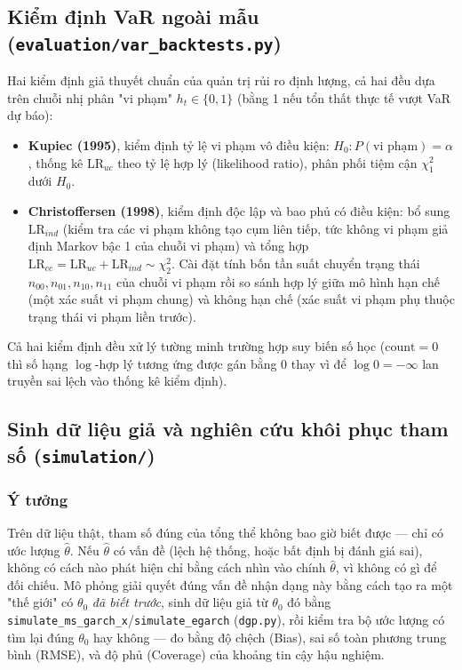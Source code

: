 \documentclass[11pt,a4paper]{article}
\newcommand{\code}[1]{\texttt{#1}}
\newcommand{\file}[1]{\texttt{#1}}
\begin{document}
\subsection{Kiểm định VaR ngoài mẫu (\file{evaluation/var\_backtests.py})}

Hai kiểm định giả thuyết chuẩn của quản trị rủi ro định lượng, cả hai đều dựa trên
chuỗi nhị phân "vi phạm" $h_t \in \{0,1\}$ (bằng 1 nếu tổn thất thực tế vượt VaR dự
báo):

\begin{itemize}
  \item \textbf{Kupiec (1995)}, kiểm định tỷ lệ vi phạm vô điều kiện: $H_0: P(\text{vi
    phạm})=\alpha$, thống kê $\mathrm{LR}_{uc}$ theo tỷ lệ hợp lý (likelihood ratio),
    phân phối tiệm cận $\chi^2_1$ dưới $H_0$.
  \item \textbf{Christoffersen (1998)}, kiểm định độc lập và bao phủ có điều kiện: bổ
    sung $\mathrm{LR}_{ind}$ (kiểm tra các vi phạm không tạo cụm liên tiếp, tức không
    vi phạm giả định Markov bậc 1 của chuỗi vi phạm) và tổng hợp $\mathrm{LR}_{cc} =
    \mathrm{LR}_{uc}+\mathrm{LR}_{ind}\sim\chi^2_2$. Cài đặt tính bốn tần suất
    chuyển trạng thái $n_{00},n_{01},n_{10},n_{11}$ của chuỗi vi phạm rồi so sánh hợp
    lý giữa mô hình hạn chế (một xác suất vi phạm chung) và không hạn chế (xác suất
    vi phạm phụ thuộc trạng thái vi phạm liền trước).
\end{itemize}

Cả hai kiểm định đều xử lý tường minh trường hợp suy biến số học ($\mathrm{count}=0$
thì số hạng $\log$-hợp lý tương ứng được gán bằng 0 thay vì để $\log 0 = -\infty$ lan
truyền sai lệch vào thống kê kiểm định).

\subsection{Sinh dữ liệu giả và nghiên cứu khôi phục tham số (\file{simulation/})}

\subsubsection{Ý tưởng}

Trên dữ liệu thật, tham số đúng của tổng thể không bao giờ biết được --- chỉ có ước
lượng $\hat\theta$. Nếu $\hat\theta$ có vấn đề (lệch hệ thống, hoặc bất định bị đánh
giá sai), không có cách nào phát hiện chỉ bằng cách nhìn vào chính $\hat\theta$, vì
không có gì để đối chiếu. Mô phỏng giải quyết đúng vấn đề nhận dạng này bằng cách tạo
ra một "thế giới" có $\theta_0$ \emph{đã biết trước}, sinh dữ liệu giả từ $\theta_0$
đó bằng \code{simulate\_ms\_garch\_x}/\code{simulate\_egarch} (\file{dgp.py}), rồi
kiểm tra bộ ước lượng có tìm lại đúng $\theta_0$ hay không --- đo bằng độ chệch
(Bias), sai số toàn phương trung bình (RMSE), và độ phủ (Coverage) của khoảng tin cậy
hậu nghiệm.
\end{document}
